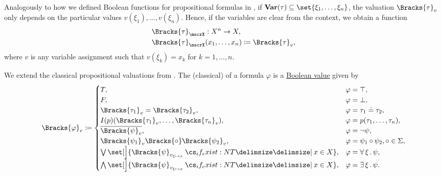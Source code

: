 \begin{definition}
\begin{thmenum}
     Analogously to how we defined Boolean functions for propositional formulas in , if \( \boldop{Var}(\tau) \subseteq \set{ \xi_1, \ldots, \xi_n } \), the valuation \( \Bracks{\tau}_v \) only depends on the particular values \( v(\xi_1), \ldots, v(\xi_n) \). Hence, if the variables are clear from the context, we obtain a function
    \begin{equation*}
      \begin{aligned}
        &\Bracks{\tau}_\mscrX: X^n \to X, \\
        &\Bracks{\tau}_\mscrX(x_1, \ldots, x_n) \coloneqq \Bracks{\tau}_v,
      \end{aligned}
    \end{equation*}
    where \( v \) is any variable assignment such that \( v(\xi_k) = x_k \) for \( k = 1, \ldots, n \).

     We extend the classical propositional valuations from . The (classical)  of a formula \( \varphi \) is a \hyperref[def:boolean_value]{Boolean value} given by
    \begin{equation}\label{eq:def:first_order_valuation/formula_valuation}
      \Bracks{\varphi}_v \coloneqq \begin{cases}
        T,                                                                        &\varphi = \top, \\
        F,                                                                        &\varphi = \bot, \\
        \Bracks{\tau_1}_v = \Bracks{\tau_2}_v,                                    &\varphi = \tau_1 \doteq \tau_2, \\
        I(p)(\Bracks{\tau_1}_v, \ldots, \Bracks{\tau_n}_v),                       &\varphi = p(\tau_1, \ldots, \tau_n), \\
        \overline{\Bracks{\psi}_v},                                               &\varphi = \neg \psi, \\
        \Bracks{\psi_1}_v \Bracks{\bincirc} \Bracks{\psi_2}_v,                    &\varphi = \psi_1 \bincirc \psi_2, \bincirc \in \Sigma, \\
        \bigvee\set[\Big]{ \Bracks{\psi}_{v_{\xi \mapsto x}} \given* x \in X },   &\varphi = \qforall \xi \psi, \\
        \bigwedge\set[\Big]{ \Bracks{\psi}_{v_{\xi \mapsto x}} \given* x \in X }, &\varphi = \qexists \xi \psi.
      \end{cases}
    \end{equation}


\end{thmenum}
\end{definition}
